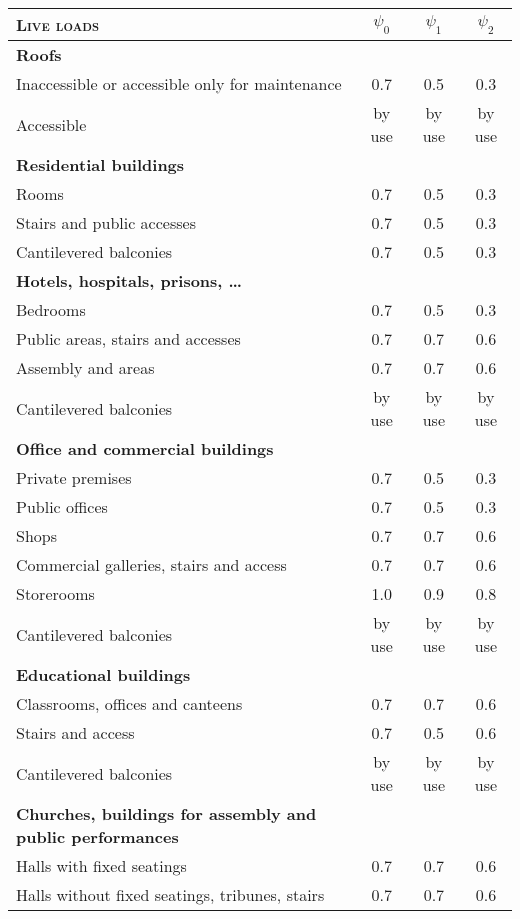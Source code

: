 \begin{table}
\begin{center}
\begin{small}
\begin{tabular}{|l|c|c|c|}
\hline
\textsc{Live loads} & $\psi_{0}$ & $\psi_{1}$ & $\psi_{2}$ \\
\hline
\textbf{Roofs} & & & \\
\hline
Inaccessible or accessible only for maintenance & 0.7 & 0.5 & 0.3 \\
Accessible & by use & by use & by use \\
\hline
\textbf{Residential buildings} & & & \\
\hline
Rooms & 0.7 & 0.5 & 0.3 \\
Stairs and public accesses & 0.7 & 0.5 & 0.3 \\
Cantilevered balconies & 0.7 & 0.5 & 0.3 \\
\hline
\textbf{Hotels, hospitals, prisons, \ldots} & & & \\
\hline
Bedrooms & 0.7 & 0.5 & 0.3 \\
Public areas, stairs and accesses & 0.7 & 0.7 & 0.6 \\
Assembly and areas  & 0.7 & 0.7 & 0.6 \\
Cantilevered balconies & by use & by use & by use \\
\hline
\textbf{Office and commercial buildings} & & & \\
\hline
Private premises & 0.7 & 0.5 & 0.3 \\
Public offices & 0.7 & 0.5 & 0.3 \\
Shops & 0.7 & 0.7 & 0.6 \\
Commercial galleries, stairs and access & 0.7 & 0.7 & 0.6 \\
Storerooms & 1.0 & 0.9 & 0.8 \\
Cantilevered balconies & by use & by use & by use \\
\hline
\textbf{Educational buildings} & & & \\
\hline
Classrooms, offices and canteens & 0.7 & 0.7 & 0.6 \\
Stairs and access & 0.7 & 0.5 & 0.6 \\
Cantilevered balconies & by use & by use & by use \\
\hline
\textbf{Churches, buildings for assembly and public performances} & & & \\
\hline
Halls with fixed seatings & 0.7 & 0.7 & 0.6 \\
Halls without fixed seatings, tribunes, stairs & 0.7 & 0.7 & 0.6 \\

\end{tabular}
\end{small}
\end{center}
\end{table}
